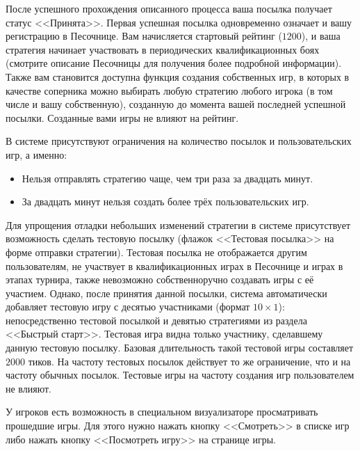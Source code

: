 После успешного прохождения описанного процесса ваша посылка получает статус <<Принята>>. Первая успешная посылка одновременно означает и
вашу регистрацию в Песочнице. Вам начисляется стартовый рейтинг ($1200$), и ваша стратегия начинает участвовать в периодических
квалификационных боях (смотрите описание Песочницы для получения более подробной информации). Также вам становится доступна функция создания
собственных игр, в которых в качестве соперника можно выбирать любую стратегию любого игрока (в том числе и вашу собственную), созданную до
момента вашей последней успешной посылки. Созданные вами игры не влияют на рейтинг.

В системе присутствуют ограничения на количество посылок и пользовательских игр, а именно:
\vspace{-0.15in}
\begin{itemize}
  \item Нельзя отправлять стратегию чаще, чем три раза за двадцать минут.
\vspace{-0.10in}
  \item За двадцать минут нельзя создать более трёх пользовательских игр.
\vspace{-0.10in}
\end{itemize}

Для упрощения отладки небольших изменений стратегии в системе присутствует возможность сделать тестовую посылку (флажок <<Тестовая посылка>>
на форме отправки стратегии). Тестовая посылка не отображается другим пользователям, не участвует в квалификационных играх в Песочнице и
играх в этапах турнира, также невозможно собственноручно создавать игры с её участием. Однако, после принятия данной посылки, система
автоматически добавляет тестовую игру с десятью участниками (формат $10\times1$): непосредственно тестовой посылкой и девятью стратегиями из
раздела <<Быстрый старт>>. Тестовая игра видна только участнику, сделавшему данную тестовую посылку. Базовая длительность такой тестовой
игры составляет $2000$ тиков. На частоту тестовых посылок действует то же ограничение, что и на частоту обычных посылок. Тестовые игры на
частоту создания игр пользователем не влияют.

У игроков есть возможность в специальном визуализаторе просматривать прошедшие игры. Для этого нужно нажать кнопку <<Смотреть>> в списке игр
либо нажать кнопку <<Посмотреть игру>> на странице игры.

